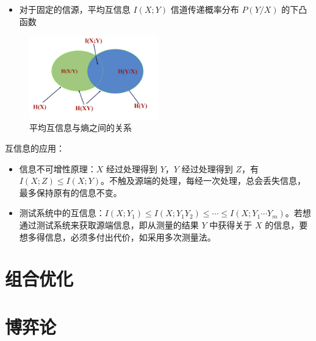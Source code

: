 \begin{remark}
\begin{itemize}
        \item 对于固定的信源，平均互信息 $I(X; Y)$ 信道传递概率分布 $P(Y / X)$ 的下凸
        函数
    \end{itemize}
    \begin{figure}[htbp]
        \centering
        \includegraphics[width=0.5\textwidth]{./figure/fig2.png}
        \caption{平均互信息与熵之间的关系}
    \end{figure}
\end{remark}

\begin{remark}
    互信息的应用：
    \begin{itemize}
        \item 信息不可增性原理：$X$ 经过处理得到 $Y$，$Y$ 经过处理得到 $Z$，有 $I(X; Z) \le I(X; Y)$。不触及源端的处理，每经一次处理，总会丢失信息，最多保持原有的信息不变。
        \item 测试系统中的互信息：$I(X; Y_1) \le I(X; Y_1Y_2) \le \cdots \le I(X; Y_1\cdots Y_m)$。若想通过测试系统来获取源端信息，即从测量的结果 $Y$ 中获得关于 $X$ 的信息，要想多得信息，必须多付出代价，如采用多次测量法。
    \end{itemize}
\end{remark}

\section{组合优化}
\section{博弈论}


